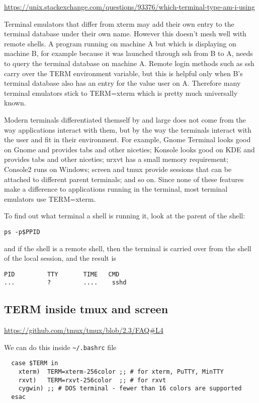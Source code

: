 \url{https://unix.stackexchange.com/questions/93376/which-terminal-type-am-i-using}

Terminal emulators that differ from xterm may add their own entry to the
terminal database under their own name. However this doesn't mesh well with
remote shells.
A program running on machine A but which is displaying on machine B, for example
because it was launched through ssh from B to A, needs to query the terminal
database on machine A. Remote login methods such as ssh carry over the TERM
environment variable, but this is helpful only when B's terminal database also
has an entry for the value user on A. Therefore many terminal emulators stick to
TERM=xterm which is pretty much universally known.


Modern terminals differentiated themself by and large does not come from the way
applications interact with them, but by the way the terminals interact with the
user and fit in their environment. For example, Gnome Terminal looks good on
Gnome and provides tabs and other niceties; Konsole looks good on KDE and
provides tabs and other niceties; urxvt has a small memory requirement; Console2
runs on Windows; screen and tmux provide sessions that can be attached to
different parent terminals; and so on. Since none of these features make a
difference to applications running in the terminal, most terminal emulators use
TERM=xterm.

To find out what terminal a shell is running it, look at the parent of the shell:
\begin{verbatim}
ps -p$PPID
\end{verbatim}
and if the shell is a remote shell, then the terminal is carried over from the
shell of the local session, and the result is 
\begin{verbatim}
PID         TTY       TIME   CMD
...         ?         ....    sshd
\end{verbatim}



\subsection{TERM inside tmux and screen}
\label{sec:TERM-in-tmux-screen}
\label{sec:tmux-TERM}
\label{sec:screen-TERM}

\url{https://github.com/tmux/tmux/blob/2.3/FAQ#L4}

We can do this inside \verb!~/.bashrc! file

{\tiny
\begin{verbatim}
  case $TERM in
    xterm)  TERM=xterm-256color ;; # for xterm, PuTTY, MinTTY
    rxvt)   TERM=rxvt-256color  ;; # for rxvt
    cygwin) ;; # DOS terminal - fewer than 16 colors are supported
  esac
\end{verbatim}
}


